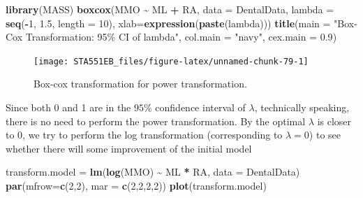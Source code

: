 \documentclass[
]{book}
\newenvironment{Shaded}{\begin{snugshade}}{\end{snugshade}}
\newcommand{\AttributeTok}[1]{\textcolor[rgb]{0.13,0.29,0.53}{#1}}
\newcommand{\DecValTok}[1]{\textcolor[rgb]{0.00,0.00,0.81}{#1}}
\newcommand{\FloatTok}[1]{\textcolor[rgb]{0.00,0.00,0.81}{#1}}
\newcommand{\FunctionTok}[1]{\textcolor[rgb]{0.13,0.29,0.53}{\textbf{#1}}}
\newcommand{\NormalTok}[1]{#1}
\newcommand{\OtherTok}[1]{\textcolor[rgb]{0.56,0.35,0.01}{#1}}
\newcommand{\SpecialCharTok}[1]{\textcolor[rgb]{0.81,0.36,0.00}{\textbf{#1}}}
\newcommand{\StringTok}[1]{\textcolor[rgb]{0.31,0.60,0.02}{#1}}
\begin{document}
\begin{Shaded}
\begin{Highlighting}[]
\FunctionTok{library}\NormalTok{(MASS)}
\FunctionTok{boxcox}\NormalTok{(MMO }\SpecialCharTok{\textasciitilde{}}\NormalTok{ ML }\SpecialCharTok{+}\NormalTok{ RA, }
       \AttributeTok{data =}\NormalTok{ DentalData, }
       \AttributeTok{lambda =} \FunctionTok{seq}\NormalTok{(}\SpecialCharTok{{-}}\DecValTok{1}\NormalTok{, }\FloatTok{1.5}\NormalTok{, }\AttributeTok{length =} \DecValTok{10}\NormalTok{), }
       \AttributeTok{xlab=}\FunctionTok{expression}\NormalTok{(}\FunctionTok{paste}\NormalTok{(lambda)))}
\FunctionTok{title}\NormalTok{(}\AttributeTok{main =} \StringTok{"Box{-}Cox Transformation: 95\% CI of lambda"}\NormalTok{,}
      \AttributeTok{col.main =} \StringTok{"navy"}\NormalTok{, }\AttributeTok{cex.main =} \FloatTok{0.9}\NormalTok{)}
\end{Highlighting}
\end{Shaded}

\begin{figure}

{\centering \texttt{[image: STA551EB\_files/figure-latex/unnamed-chunk-79-1]} 

}

\caption{Box-cox transformation for power transformation.}\label{fig:unnamed-chunk-79}
\end{figure}

Since both 0 and 1 are in the \(95\%\) confidence interval of \(\lambda\), technically speaking, there is no need to perform the power transformation. By the optimal \(\lambda\) is closer to 0, we try to perform the log transformation (corresponding to \(\lambda =0\)) to see whether there will some improvement of the initial model

\begin{Shaded}
\begin{Highlighting}[]
\NormalTok{transform.model }\OtherTok{=} \FunctionTok{lm}\NormalTok{(}\FunctionTok{log}\NormalTok{(MMO) }\SpecialCharTok{\textasciitilde{}}\NormalTok{ ML }\SpecialCharTok{*}\NormalTok{ RA, }\AttributeTok{data  =}\NormalTok{ DentalData)}
\FunctionTok{par}\NormalTok{(}\AttributeTok{mfrow=}\FunctionTok{c}\NormalTok{(}\DecValTok{2}\NormalTok{,}\DecValTok{2}\NormalTok{), }\AttributeTok{mar =} \FunctionTok{c}\NormalTok{(}\DecValTok{2}\NormalTok{,}\DecValTok{2}\NormalTok{,}\DecValTok{2}\NormalTok{,}\DecValTok{2}\NormalTok{))}
\FunctionTok{plot}\NormalTok{(transform.model)}
\end{Highlighting}
\end{Shaded}
\end{document}
